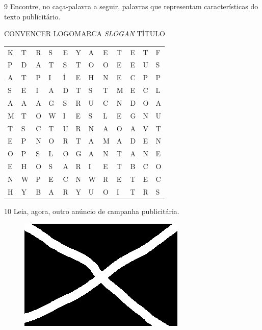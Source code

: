 \begin{mdframed}[linewidth=2pt,linecolor=salmao,roundcorner=20pt]
\vspace{7cm}
\end{mdframed}

\num{9} Encontre, no caça-palavra a seguir, palavras que representam
características do texto publicitário.

\begin{myquote}
CONVENCER \hfill LOGOMARCA \hfill \textit{SLOGAN} \hfill TÍTULO \hfill
\end{myquote}

\begin{center}
\begin{tabular}{llllllllllll}
K & T & R & S & E & Y & A & E & T & E & T & F\\
P & D & A & T & S & T & O & O & E & E & U & S\\
A & T & P & I & Í & E & H & N & E & C & P & P\\
S & E & I & A & D & T & S & T & M & E & C & L\\
A & A & A & G & S & R & U & C & N & D & O & A\\
M & T & O & W & I & E & S & L & E & G & N & U\\
T & S & C & T & U & R & N & A & O & A & V & T\\
E & P & N & O & R & T & A & M & A & D & E & N\\
O & P & S & L & O & G & A & N & T & A & N & E\\
E & H & O & S & A & R & I & E & T & B & C & O\\
N & W & P & E & C & N & W & R & E & T & E & C\\
H & Y & B & A & R & Y & U & O & I & T & R & S
\end{tabular}
\end{center}

\num{10} Leia, agora, outro anúncio de campanha publicitária.

\begin{figure}[htpb!]
\includegraphics[width=\textwidth]{./media/confederados.png}
\end{figure}

